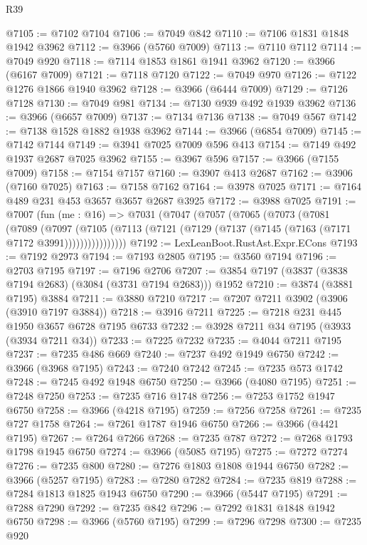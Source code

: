 \begin{lexlean}{R39}
\begin{coremodule}
@7105 := @7102 @7104
@7106 := @7049 @842
@7110 := @7106 @1831 @1848 @1942 @3962
@7112 := @3966 (@5760 @7009)
@7113 := @7110 @7112
@7114 := @7049 @920
@7118 := @7114 @1853 @1861 @1941 @3962
@7120 := @3966 (@6167 @7009)
@7121 := @7118 @7120
@7122 := @7049 @970
@7126 := @7122 @1276 @1866 @1940 @3962
@7128 := @3966 (@6444 @7009)
@7129 := @7126 @7128
@7130 := @7049 @981
@7134 := @7130 @939 @492 @1939 @3962
@7136 := @3966 (@6657 @7009)
@7137 := @7134 @7136
@7138 := @7049 @567
@7142 := @7138 @1528 @1882 @1938 @3962
@7144 := @3966 (@6854 @7009)
@7145 := @7142 @7144
@7149 := @3941 @7025 @7009 @596 @413
@7154 := @7149 @492 @1937 @2687 @7025 @3962
@7155 := @3967 @596
@7157 := @3966 (@7155 @7009)
@7158 := @7154 @7157
@7160 := @3907 @413 @2687
@7162 := @3906 (@7160 @7025)
@7163 := @7158 @7162
@7164 := @3978 @7025
@7171 := @7164 @489 @231 @453 @3657 @3657 @2687 @3925
@7172 := @3988 @7025
@7191 := @7007
    (fun (me : @16) =>
    @7031
      (@7047
        (@7057
          (@7065
            (@7073
              (@7081
                (@7089
                  (@7097
                    (@7105
                      (@7113 (@7121 (@7129 (@7137 (@7145 (@7163 (@7171 @7172 @3991))))))))))))))))
@7192 := LexLeanBoot.RustAst.Expr.ECons
@7193 := @7192 @2973
@7194 := @7193 @2805
@7195 := @3560 @7194
@7196 := @2703 @7195
@7197 := @7196 @2706
@7207 := @3854 @7197 (@3837 (@3838 @7194 @2683) (@3084 (@3731 @7194 @2683))) @1952
@7210 := @3874 (@3881 @7195) @3884
@7211 := @3880 @7210
@7217 := @7207 @7211 @3902 (@3906 (@3910 @7197 @3884))
@7218 := @3916 @7211
@7225 := @7218 @231 @445 @1950 @3657 @6728 @7195 @6733
@7232 := @3928 @7211 @34 @7195 (@3933 (@3934 @7211 @34))
@7233 := @7225 @7232
@7235 := @4044 @7211 @7195
@7237 := @7235 @486 @669
@7240 := @7237 @492 @1949 @6750
@7242 := @3966 (@3968 @7195)
@7243 := @7240 @7242
@7245 := @7235 @573 @1742
@7248 := @7245 @492 @1948 @6750
@7250 := @3966 (@4080 @7195)
@7251 := @7248 @7250
@7253 := @7235 @716 @1748
@7256 := @7253 @1752 @1947 @6750
@7258 := @3966 (@4218 @7195)
@7259 := @7256 @7258
@7261 := @7235 @727 @1758
@7264 := @7261 @1787 @1946 @6750
@7266 := @3966 (@4421 @7195)
@7267 := @7264 @7266
@7268 := @7235 @787
@7272 := @7268 @1793 @1798 @1945 @6750
@7274 := @3966 (@5085 @7195)
@7275 := @7272 @7274
@7276 := @7235 @800
@7280 := @7276 @1803 @1808 @1944 @6750
@7282 := @3966 (@5257 @7195)
@7283 := @7280 @7282
@7284 := @7235 @819
@7288 := @7284 @1813 @1825 @1943 @6750
@7290 := @3966 (@5447 @7195)
@7291 := @7288 @7290
@7292 := @7235 @842
@7296 := @7292 @1831 @1848 @1942 @6750
@7298 := @3966 (@5760 @7195)
@7299 := @7296 @7298
@7300 := @7235 @920

\end{coremodule}
\end{lexlean}
